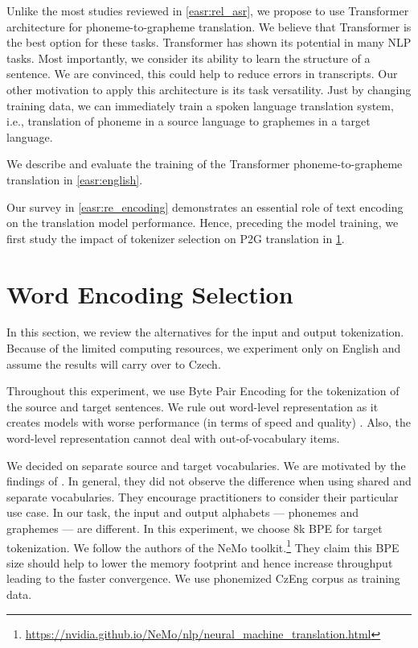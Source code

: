 Unlike the most studies reviewed in \cref{easr:rel_asr}, we propose to use Transformer architecture for phoneme-to-grapheme translation. We believe that Transformer is the best option for these tasks. Transformer has shown its potential in many NLP tasks. Most importantly, we consider its ability to learn the structure of a sentence. We are convinced, this could help to reduce errors in transcripts. Our other motivation to apply this architecture is its task versatility. Just by changing training data, we can immediately train a spoken language translation system, i.e., translation of phoneme in a source language to graphemes in a target language. 

We describe and evaluate the training of the Transformer phoneme-to-grapheme translation in \cref{easr:english}.

Our survey in \cref{easr:re_encoding} demonstrates an essential role of text encoding on the translation model performance. Hence, preceding the model training, we first study the impact of tokenizer selection on P2G translation in \cref{easr:tokenizer}.


\section{Word Encoding Selection}
\label{easr:tokenizer}

In this section, we review the alternatives for the input and output tokenization. Because of the limited computing resources, we experiment only on English and assume the results will carry over to Czech. 

Throughout this experiment, we use Byte Pair Encoding for the tokenization of the source and target sentences. We rule out word-level representation as it creates models with worse performance (in terms of speed and quality) . Also, the word-level representation cannot deal with out-of-vocabulary items.

We decided on separate source and target vocabularies. We are motivated by the findings of . In general, they did not observe the difference when using shared and separate vocabularies. They encourage practitioners to consider their particular use case. In our task, the input and output alphabets --- phonemes and graphemes --- are different. In this experiment, we choose 8k BPE for target tokenization. We follow the authors of the NeMo toolkit.\footnote{\url{https://nvidia.github.io/NeMo/nlp/neural\_machine\_translation.html}} They claim this BPE size should help to lower the memory footprint and hence increase throughput leading to the faster convergence. We use phonemized CzEng corpus as training data.

